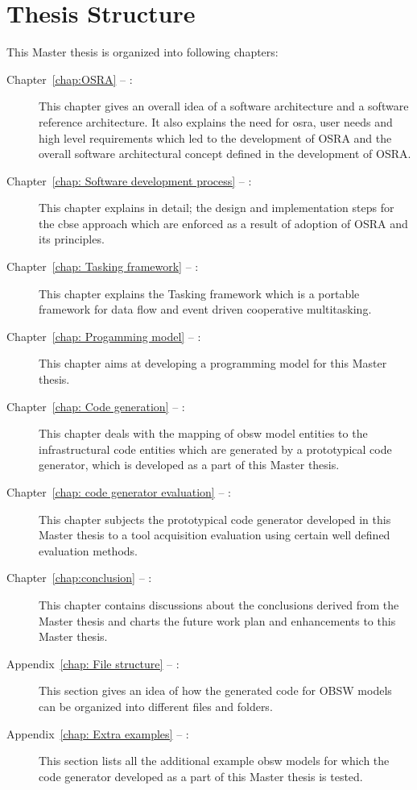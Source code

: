 \section{Thesis Structure}
This Master thesis is organized into following chapters:
\begin{description}
\item[Chapter~\ref{chap:OSRA} -- :] This chapter gives an overall idea of a software architecture and a software reference architecture. It also explains the need for \ac{osra}, user needs and high level requirements which led to the development of OSRA and the overall software architectural concept defined in the development of OSRA.  
\item[Chapter~\ref{chap: Software development process} -- :] This chapter explains in detail; the design and implementation steps for the \ac{cbse} approach which are enforced as a result of adoption of OSRA and its principles.
\item[Chapter~\ref{chap: Tasking framework} -- :] This chapter explains the Tasking framework which is a portable framework for data flow and event driven cooperative multitasking.    
\item[Chapter~\ref{chap: Progamming model} -- :] This chapter aims at developing a programming model for this Master thesis. 
\item[Chapter~\ref{chap: Code generation} -- :] This chapter deals with the mapping of \ac{obsw} model entities to the infrastructural code entities which are generated by a prototypical code generator, which is developed as a part of this Master thesis.
\item[Chapter~\ref{chap: code generator evaluation} -- :] This chapter subjects the prototypical code generator developed in this Master thesis to a tool acquisition evaluation using certain well defined evaluation methods. 
\item[Chapter~\ref{chap:conclusion} -- :] This chapter contains discussions about the conclusions derived from the Master thesis and charts the future work plan and enhancements to this Master thesis.
\item[Appendix~\ref{chap: File structure} -- :] This section gives an idea of how the generated code for OBSW models can be organized into different files and folders.
\item[Appendix~\ref{chap: Extra examples} -- :] This section lists all the additional example \ac{obsw} models for which the code generator developed as a part of this Master thesis is tested.
\end{description}
